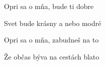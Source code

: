 \begin{song}
\bigskip


\bigskip

 Opri sa o mňa,  bude ti dobre \par
{} Svet bude krásny  a nebo modré \par
{} Opri sa o mňa,  zabudneš na to \par
{} Že občas býva na cestách blato \par

\end{song}

